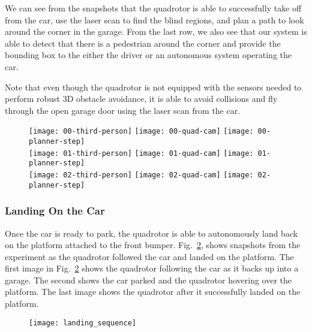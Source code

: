 We can see from the snapshots that the quadrotor is able to successfully take
off from the car, use the laser scan to find the blind regions, and plan a path
to look around the corner in the garage. From the last row, we also see that
our system is able to detect that there is a pedestrian around the corner and
provide the bounding box to the either the driver or an autonomous system
operating the car.

Note that even though the quadrotor is not equipped with the sensors needed to
perform robust 3D obstacle avoidance, it is able to avoid collisions and fly
through the open garage door using the laser scan from the car.

\begin{figure}[h!]

    \centering

    \texttt{[image: 00-third-person]}
    \texttt{[image: 00-quad-cam]}
    \texttt{[image: 00-planner-step]} \\
    \vspace*{1mm}
    \texttt{[image: 01-third-person]}
    \texttt{[image: 01-quad-cam]}
    \texttt{[image: 01-planner-step]} \\
    \vspace*{1mm}
    \texttt{[image: 02-third-person]}
    \texttt{[image: 02-quad-cam]}
    \texttt{[image: 02-planner-step]}

    \caption{}

    \label{fig:experiment}

\end{figure}

\subsubsection{Landing On the Car}

Once the car is ready to park, the quadrotor is able to autonomously land back
on the platform attached to the front bumper. Fig.~\ref{fig:landing}, shows
snapshots from the experiment as the quadrotor followed the car and landed on
the platform. The first image in Fig.~\ref{fig:landing} shows the quadrotor
following the car as it backs up into a garage. The second shows the car parked
and the quadrotor hovering over the platform. The last image shows the
quadrotor after it successfully landed on the platform.

\begin{figure}[h!]

    \centering

    \centerline{\texttt{[image: landing\_sequence]}}

    \caption{}

    \label{fig:landing}

\end{figure}
